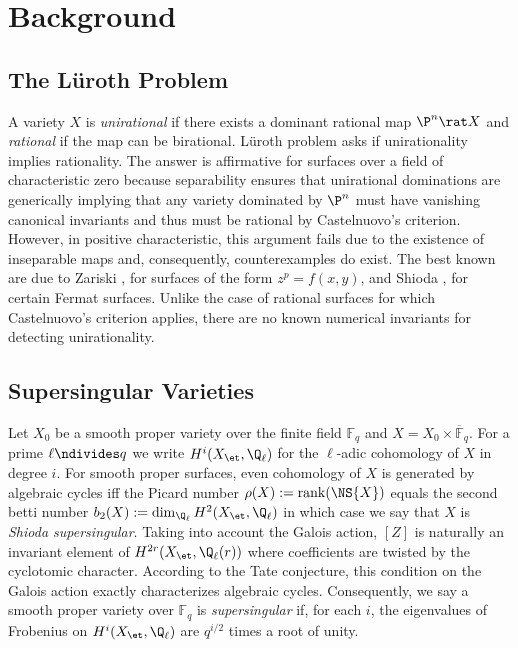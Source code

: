 \documentclass[10pt]{amsart}
\begin{document}
\thispagestyle{fancy}

\section*{Background}
\subsection*{The L\"{u}roth Problem}

A variety $X$ is \textit{unirational} if there exists a dominant rational map $\P^n \rat X$ and \textit{rational} if the map can be birational. L\"{u}roth problem asks if unirationality implies rationality. The answer is affirmative for surfaces over a field of characteristic zero because separability ensures that unirational dominations are generically \etale implying that any variety dominated by $\P^n$ must have vanishing canonical invariants and thus must be rational by Castelnuovo's criterion. However, in positive characteristic, this argument fails due to the existence of inseparable maps and, consequently, counterexamples do exist. The best known are due to Zariski \cite{zariski1958}, for surfaces of the form $z^p = f(x, y)$, and Shioda \cite{shioda1974}, for certain Fermat surfaces. Unlike the case of rational surfaces for which Castelnuovo's criterion applies, there are no known numerical invariants for detecting unirationality.

\subsection*{Supersingular Varieties}

Let $X_0$ be a smooth proper variety over the finite field $\mathbb{F}_q$ and $X = X_0 \times \overline{\mathbb{F}}_q$. For a prime $\ell \ndivides q$ we write $H^{i}(X_{\et}, \Q_\ell)$ for the $\ell$-adic \etale cohomology of $X$ in degree $i$. For smooth proper surfaces, even cohomology of $X$ is generated by algebraic cycles iff the Picard number $\rho(X) := \mathrm{rank}(\NS{X})$ equals the second betti number $b_2(X) := \dim_{\Q_\ell} H^2(X_{\et}, \Q_\ell)$ in which case we say that $X$ is \textit{Shioda supersingular}.
Taking into account the Galois action, $[Z]$ is naturally an invariant element of $H^{2r}(X_{\et}, \Q_\ell(r))$ where coefficients are twisted by the cyclotomic character. According to the Tate conjecture, this condition on the Galois action exactly characterizes algebraic cycles. Consequently, we say a smooth proper variety over $\mathbb{F}_q$ is \textit{supersingular} if, for each $i$, the eigenvalues of Frobenius on $H^{i}(X_{\et}, \Q_\ell)$ are $q^{i/2}$ times a root of unity. 
\end{document}
